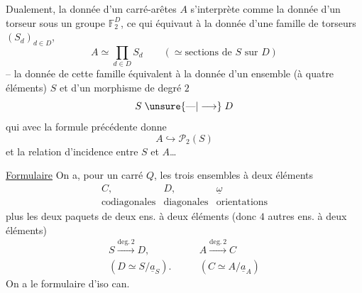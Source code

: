 
Dualement,  la donnée d'un carré-arêtes $A$ s'interprète comme la donnée d'un torseur sous un groupe $\mathbb F_2^D$, ce qui équivaut à la donnée d'une famille de torseurs $(S_d)_{d\in D}$,  
\[
A\simeq\prod_{d\in D}S_d\qquad(\simeq\text{sections de }S\text{ sur }D)
\]
-- la donnée de cette famille équivalent à la donnée d'un ensemble (à quatre éléments) $S$ et d'un morphisme de degré $2$
\[
S\mathrel{\unsure{\text{---}|\longrightarrow}}D
\]
qui avec la formule précédente donne
\[
A\hookrightarrow\mathscr P_2(S)
\]
et la relation d'incidence entre $S$ et $A$\ldots

\uline{Formulaire} On a, pour un carré $Q$, les trois ensembles à deux éléments
\[
\begin{array}{ccc}
 C,&D,&\underline\omega\\
 \text{codiagonales}&\text{diagonales}&\text{orientations}
\end{array}
\]
plus les deux paquets de deux ens. à deux éléments (donc $4$ autres ens. à deux éléments)
\[
\begin{aligned}
S\xrightarrow{\mathrm{deg.}\,2}D,\qquad & A\xrightarrow{\mathrm{deg.}\,2}C\\
(D\simeq S/\underline a_S).\qquad &(C\simeq A/\underline a_A)
\end{aligned}
\]
On a le formulaire d'iso can.



